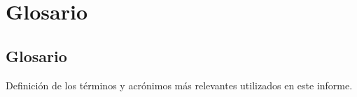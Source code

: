 \chapter{Glosario}
\label{chapter:Glosario}



\section{Glosario}

Definición de los términos y acrónimos más relevantes utilizados en este informe.
